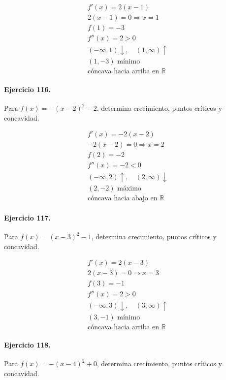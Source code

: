 \documentclass[11pt,a4paper]{article}
\begin{document}
\[
\begin{aligned}
f'(x)=2(x-1)\\
2(x-1)=0\Rightarrow x=1\\
f(1)=-3\\
f''(x)=2>0\\
(-\infty,1)\downarrow,\quad(1,\infty)\uparrow\\
(1,-3)\text{ mínimo}\\
\text{{cóncava hacia arriba en }}\mathbb{R}
\end{aligned}
\]


\paragraph{Ejercicio 116.} Para $f(x)=-(x-2)^2-2$, determina crecimiento, puntos críticos y concavidad.

\[
\begin{aligned}
f'(x)=-2(x-2)\\
-2(x-2)=0\Rightarrow x=2\\
f(2)=-2\\
f''(x)=-2<0\\
(-\infty,2)\uparrow,\quad(2,\infty)\downarrow\\
(2,-2)\text{ máximo}\\
\text{{cóncava hacia abajo en }}\mathbb{R}
\end{aligned}
\]


\paragraph{Ejercicio 117.} Para $f(x)=(x-3)^2-1$, determina crecimiento, puntos críticos y concavidad.

\[
\begin{aligned}
f'(x)=2(x-3)\\
2(x-3)=0\Rightarrow x=3\\
f(3)=-1\\
f''(x)=2>0\\
(-\infty,3)\downarrow,\quad(3,\infty)\uparrow\\
(3,-1)\text{ mínimo}\\
\text{{cóncava hacia arriba en }}\mathbb{R}
\end{aligned}
\]


\paragraph{Ejercicio 118.} Para $f(x)=-(x-4)^2+0$, determina crecimiento, puntos críticos y concavidad.
\end{document}
